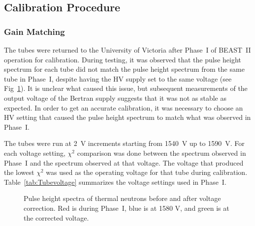 \subsection{Calibration Procedure}


\subsubsection{Gain Matching}

	The \he tubes were returned to the University of Victoria after Phase~I of BEAST~II operation for calibration. During testing, it was observed that the pulse height spectrum for each \he tube did not match the pulse height spectrum from the same tube in Phase~I, despite having the HV supply set to the same voltage (see Fig~\ref{fig:pulseHeightSpectrumDifferenceBaA}). It is unclear what caused this issue, but subsequent measurements of the output voltage of the Bertran supply suggests that it was not as stable as expected. In order to get an accurate calibration, it was necessary to choose an HV setting that caused the pulse height spectrum to match what was observed in Phase~I. 

	The \he tubes were run at 2~V increments starting from 1540~V up to 1590~V. For each voltage setting, $\chi^2$ comparison was done between the spectrum observed in Phase~I and the spectrum observed at that voltage. The voltage that produced the lowest $\chi^2$ was used as the operating voltage for that tube during calibration. Table~\ref{tab:Tubevoltage} summarizes the voltage settings used in Phase~I. 


\begin{figure}
	\centering
	\caption[Pulse height spectra before and after voltage correction]{Pulse height spectra of thermal neutrons before and after voltage correction. Red is during Phase~I, blue is at 1580 V, and green is at the corrected voltage.}
	\label{fig:pulseHeightSpectrumDifferenceBaA}
\end{figure}




